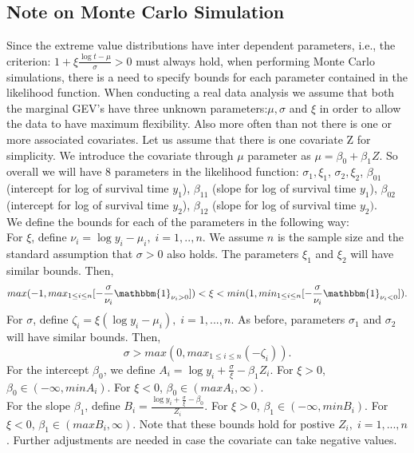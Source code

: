 \documentclass[11pt]{article}
\theoremstyle{remboldstyle}
\begin{document}
\subsection{Note on Monte Carlo Simulation}
\label{sec:note1}
\noindent
Since the extreme value distributions have inter dependent parameters, i.e., the criterion: $1 + \xi \frac{\log t - \mu}{\sigma} > 0$ must always hold, when performing Monte Carlo simulations, there is a need to specify bounds for each parameter contained in the likelihood function. When conducting a real data analysis we assume that both the marginal GEV's have three unknown parameters:$\mu, \sigma$ and $\xi$ in order to allow the data to have maximum flexibility. Also more often than not there is one or more associated covariates. Let us assume that there is one covariate Z for simplicity. We introduce the covariate through $\mu$ parameter as $\mu = \beta_0 + \beta_1Z$. So overall we will have 8 parameters in the likelihood function: $\sigma_1, \xi_1$, $\sigma_2, \xi_2$, $\beta_{01}$ (intercept for log of survival time $y_1$), $\beta_{11}$ (slope for log of survival time $y_1$), $\beta_{02}$ (intercept for log of survival time $y_2$), $\beta_{12}$ (slope for log of survival time $y_2)$.\\
We define the bounds for each of the parameters in the following way:\\
For $\xi$, define $\nu_i = \log y_i - \mu_i, \; i = 1,.., n$. We assume $n$ is the sample size and the standard assumption that $\sigma > 0$ also holds. The parameters $\xi_1$ and $\xi_2$ will have similar bounds. Then,
\[
max(-1, max_{1 \le i \le n}[-\frac{\sigma}{\nu_i}\mathbbm{1}_{\nu_i > 0}]) < \xi < min(1, min_{1 \le i \le n}[-\frac{\sigma}{\nu_i}\mathbbm{1}_{\nu_i < 0}]).
\]
For $\sigma$, define $\zeta_i = \xi (\log y_i - \mu_i), \; i = 1,..., n$. As before, parameters $\sigma_1$ and $\sigma_2$ will have similar bounds. Then,
\[
\sigma > max( 0, max_{1 \le i \le n}(-\zeta_i)).
\]
For the intercept $\beta_0$, we define $A_i = \log y_i + \frac{\sigma}{\xi} - \beta_1 Z_i$. For $\xi > 0$, $\beta_0 \in (-\infty, min A_i)$. For $\xi < 0$, $\beta_0 \in (max A_i, \infty)$.\\
For the slope $\beta_1$, define $B_i = \frac{\log y_i + \frac{\sigma}{\xi} - \beta_0 }{Z_i}$. For $\xi > 0$, $\beta_1 \in (-\infty, min B_i)$. For $\xi < 0$, $\beta_1 \in (max B_i, \infty)$. Note that these bounds hold for postive $Z_i, \; i = 1,...,n$. Further adjustments are needed in case the covariate can take negative values. 
\end{document}
